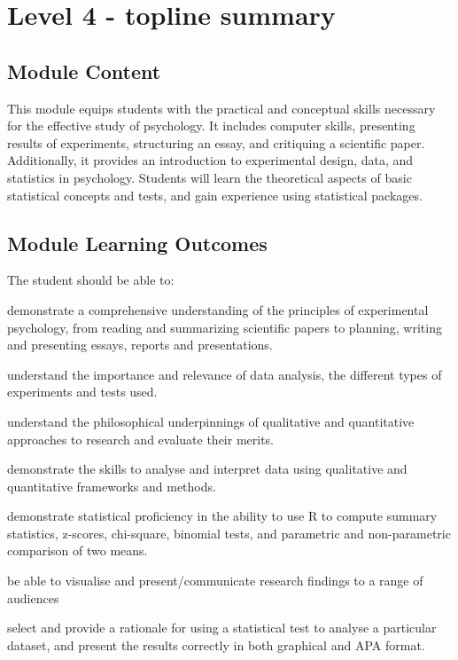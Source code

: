 \documentclass[
  11pt,
  letterpaper,
  oneside,
  open=any]{scrbook}
\begin{document}
\hypertarget{level-4---topline-summary}{%
\section{Level 4 - topline summary}\label{level-4---topline-summary}}

\hypertarget{module-content}{%
\subsection{Module Content}\label{module-content}}

This module equips students with the practical and conceptual skills
necessary for the effective study of psychology. It includes computer
skills, presenting results of experiments, structuring an essay, and
critiquing a scientific paper. Additionally, it provides an introduction
to experimental design, data, and statistics in psychology. Students
will learn the theoretical aspects of basic statistical concepts and
tests, and gain experience using statistical packages.

\hypertarget{module-learning-outcomes}{%
\subsection{Module Learning Outcomes}\label{module-learning-outcomes}}

The student should be able to:

demonstrate a comprehensive understanding of the principles of
experimental psychology, from reading and summarizing scientific papers
to planning, writing and presenting essays, reports and presentations.

understand the importance and relevance of data analysis, the different
types of experiments and tests used.

understand the philosophical underpinnings of qualitative and
quantitative approaches to research and evaluate their merits.

demonstrate the skills to analyse and interpret data using qualitative
and quantitative frameworks and methods.

demonstrate statistical proficiency in the ability to use R to compute
summary statistics, z-scores, chi-square, binomial tests, and parametric
and non-parametric comparison of two means.

be able to visualise and present/communicate research findings to a
range of audiences

select and provide a rationale for using a statistical test to analyse a
particular dataset, and present the results correctly in both graphical
and APA format.
\end{document}
